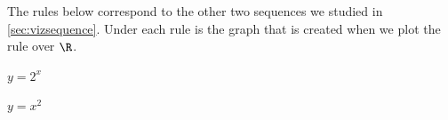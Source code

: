 The rules below correspond to the other two sequences we studied in \cref{sec:vizsequence}. Under each rule is the graph that is created when we plot the rule over $\R$.

\begin{minipage}[c]{0.5\textwidth }
	\centering
	$y = 2^x$\par\medskip
\end{minipage}
%
\begin{minipage}[c]{0.5\textwidth }
	\centering
	$y = x^2$\par\medskip
\end{minipage}

